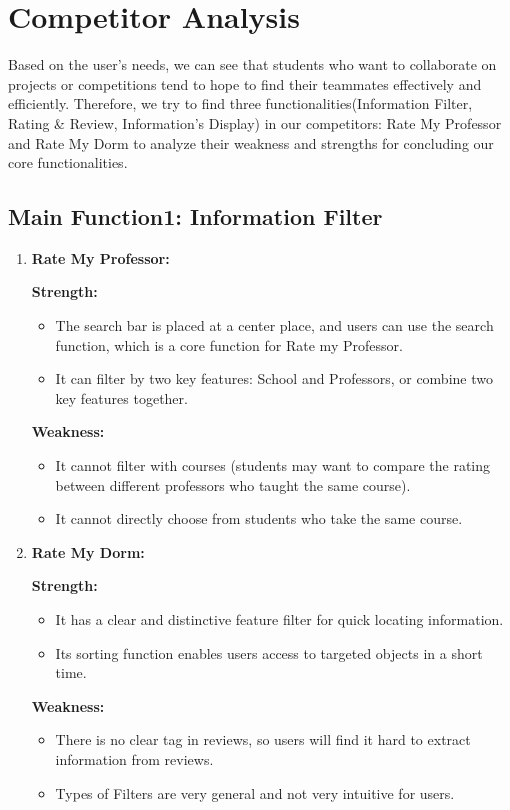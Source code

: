 \documentclass[12pt]{article}
\begin{document}
\section{Competitor Analysis}
Based on the user's needs, we can see that students who want to collaborate 
on projects or competitions tend to hope to find their teammates effectively 
and efficiently. Therefore, we try to find three functionalities(Information 
Filter, Rating \& Review, Information’s Display) in our competitors: 
Rate My Professor and Rate My Dorm to analyze their weakness and strengths 
for concluding our core functionalities.
\subsection{Main Function1: Information Filter}

\begin{enumerate}
    \item \textbf{Rate My Professor: }
    
    \textbf{Strength: }

    \begin{itemize}
        \item The search bar is placed at a center place, and users can use the search function, which is a core function for Rate my Professor.
        \item It can filter by two key features: School and Professors, or combine two key features together.
    \end{itemize}
    \textbf{Weakness: }
    \begin{itemize}
        \item It cannot filter with courses (students may want to compare the rating between different professors who taught the same course).
        \item It cannot directly choose from students who take the same course.
    \end{itemize}
    \item \textbf{Rate My Dorm: }
    
    \textbf{Strength: }
    \begin{itemize}
        \item It has a clear and distinctive feature filter for quick locating information.
        \item Its sorting function enables users access to targeted objects in a short time.
    \end{itemize}
    \textbf{Weakness: }
    \begin{itemize}
        \item There is no clear tag in reviews, so users will find it hard to extract information from reviews.
        \item Types of Filters are very general and not very intuitive for users.
\end{itemize}
\end{enumerate}
\end{document}
